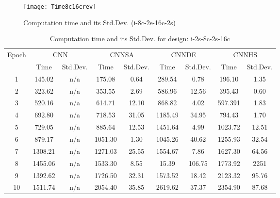 \documentclass[10pt,letterpaper]{article}
\begin{document}
\begin{figure}
\texttt{[image: Time8c16crev]}
\caption{Computation time and its Std.Dev. (i-8c-2s-16c-2s)}
\label{fig:my_label}
\end{figure}



\begin{table}[]
\small
\caption{Computation time and its Std.Dev. for design: i-2s-8c-2s-16c}
\label{tab:my_label}

\begin{tabular}{c c c c c c c c c}
\hline
\multicolumn{1}{c}{\multirow{2}{*}{Epoch}} & \multicolumn{2}{c}{CNN} &
\multicolumn{2}{c}{CNNSA} & \multicolumn{2}{c}{CNNDE} & \multicolumn{2}{c}{CNNHS}\\
\cline{2-9}

\multicolumn{1}{r}{}       & \multicolumn{1}{c}{Time} & \multicolumn{1}{c}{Std.Dev.} &
\multicolumn{1}{c}{Time} & \multicolumn{1}{c}{Std.Dev.}  & \multicolumn{1}{c}{Time} &
\multicolumn{1}{c}{Std.Dev.} & \multicolumn{1}{c}{Time} & \multicolumn{1}{c}{Std.Dev.} \\
\hline

1		& 145.02  & n/a    & 175.08  & 0.64  & 289.54  & 0.78    & 196.10  & 1.35  \\
2 		& 323.62  & n/a    & 353.55  & 2.69  & 586.96  & 12.56   & 395.43  & 0.60  \\
3		& 520.16  & n/a    & 614.71  & 12.10 & 868.82  & 4.02    & 597.391 & 1.83  \\
4		& 692.80  & n/a    & 718.53  & 31.05 & 1185.49 & 34.95   & 794.43  & 1.70  \\
5		& 729.05  & n/a    & 885.64  & 12.53 & 1451.64 & 4.99    & 1023.72 & 12.51 \\
6		& 879.17  & n/a    & 1051.30 & 1.30  & 1045.26 & 40.62   & 1255.93 & 32.54 \\
7 		& 1308.21 & n/a    & 1271.03 & 25.55 & 1554.67 & 7.86    & 1627.30 & 64.56  \\
8		& 1455.06 & n/a    & 1533.30 & 8.55  & 15.39   & 106.75  & 1773.92 & 2251  \\
9		& 1392.62 & n/a    & 1726.50 & 32.31 & 1573.52 & 18.42   & 2123.32 & 95.76  \\
10		& 1511.74 & n/a    & 2054.40 & 35.85 & 2619.62 & 37.37   & 2354.90 & 87.68 \\

\hline
\end{tabular}
\end{table}
\end{document}
